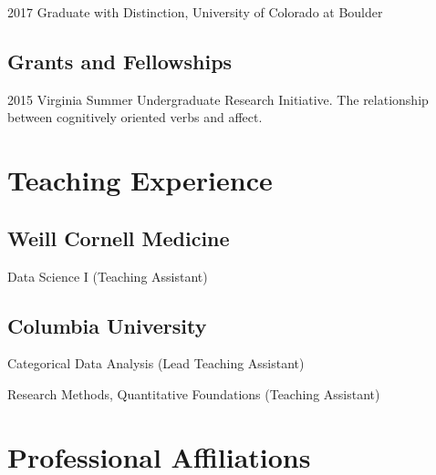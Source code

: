 \documentclass[12pt,letterpaper]{report}
\newcommand{\listitemspace}{0.15em}
\renewenvironment{itemize}
{\begin{list}{}{\setlength{\leftmargin}{0em}
            \setlength{\parskip}{0em}
            \setlength{\itemsep}{\listitemspace}
            \setlength{\parsep}{\listitemspace}}}
    {\end{list}}
\begin{document}
    \begin{tablist}

        \item[2017] \tab Graduate with Distinction, University of Colorado at Boulder

    \end{tablist}

    \subsection*{Grants and Fellowships}

    \begin{tablist}

        \item[2015] \tab Virginia Summer Undergraduate Research Initiative. The relationship between cognitively oriented verbs and affect.

    \end{tablist}

    \section*{Teaching Experience}
    
    \subsection*{Weill Cornell Medicine}
    
    \begin{itemize}
    
    	\item Data Science I (Teaching Assistant)
    
    \end{itemize}

    \subsection*{Columbia University}
    
    \begin{itemize}
    	
    	\item Categorical Data Analysis (Lead Teaching Assistant)
    	\item Research Methods, Quantitative Foundations (Teaching Assistant)
    
    \end{itemize}

    \section*{Professional Affiliations}
\end{document}
